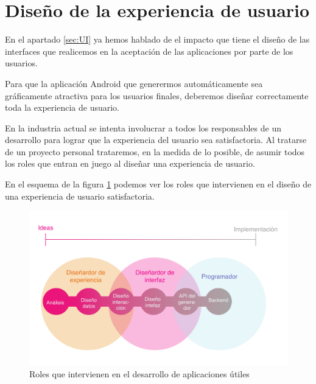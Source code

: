 \section{Diseño de la experiencia de usuario}
En el apartado \ref{sec:UI} ya hemos hablado de el impacto que tiene el diseño de las interfaces que realicemos en la aceptación de las aplicaciones por parte de los usuarios.\par
Para que la aplicación Android que generermos automáticamente sea gráficamente atractiva para los usuarios finales, deberemos diseñar correctamente toda la experiencia de usuario.\par
En la industria actual se intenta involucrar a todos los responsables de un desarrollo para lograr que la experiencia del usuario sea satisfactoria. Al tratarse de un proyecto personal trataremos, en la medida de lo posible, de asumir todos los roles que entran en juego al diseñar una experiencia de usuario.\par
En el esquema de la figura \ref{fig:uxui} podemos ver los roles que intervienen en el diseño de una experiencia de usuario satisfactoria.\medskip\par

\begin{figure}[ht]
\centering
\includegraphics[scale=0.7]{./imgs/esquemas/uxui.pdf}
\caption{Roles que intervienen en el desarrollo de aplicaciones útiles}
\label{fig:uxui}
\end{figure}

